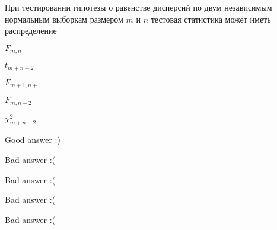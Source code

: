 
\begin{question}
При тестировании гипотезы о равенстве дисперсий по двум независимым
нормальным выборкам размером \(m\) и \(n\) тестовая статистика может
иметь распределение
\begin{answerlist}
  \item \(F_{m,n}\)
  \item \(t_{m+n-2}\)
  \item \(F_{m+1,n+1}\)
  \item \(F_{m,n - 2}\)
  \item \(\chi^2_{m+n-2}\)
\end{answerlist}
\end{question}

\begin{solution}
\begin{answerlist}
  \item Good answer :)
  \item Bad answer :(
  \item Bad answer :(
  \item Bad answer :(
  \item Bad answer :(
\end{answerlist}
\end{solution}

